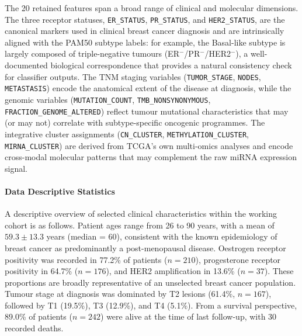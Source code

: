 The 20 retained features span a broad range of clinical and molecular
dimensions. The three receptor statuses, \texttt{ER\_STATUS},
\texttt{PR\_STATUS}, and \texttt{HER2\_STATUS}, are the canonical markers
used in clinical breast cancer diagnosis and are intrinsically aligned with the
PAM50 subtype labels: for example, the Basal-like subtype is largely composed
of triple-negative tumours (ER$^-$/PR$^-$/HER2$^-$), a well-documented
biological correspondence that provides a natural consistency check for
classifier outputs. The TNM staging variables (\texttt{TUMOR\_STAGE},
\texttt{NODES}, \texttt{METASTASIS}) encode the anatomical extent of the
disease at diagnosis, while the genomic variables (\texttt{MUTATION\_COUNT},
\texttt{TMB\_NONSYNONYMOUS}, \texttt{FRACTION\_GENOME\_ALTERED}) reflect
tumour mutational characteristics that may (or may not) correlate with subtype-specific
oncogenic programmes. The integrative cluster assignments
(\texttt{CN\_CLUSTER}, \texttt{METHYLATION\_CLUSTER}, \texttt{MIRNA\_CLUSTER})
are derived from TCGA's own multi-omics analyses and encode cross-modal
molecular patterns that may complement the raw miRNA expression signal.

\paragraph{Data Descriptive Statistics} A descriptive overview of selected clinical characteristics within the working
cohort is as follows. Patient ages range from 26 to 90 years, with a mean of
$59.3 \pm 13.3$ years (median = 60), consistent with the known epidemiology of
breast cancer as predominantly a post-menopausal disease. Oestrogen receptor
positivity was recorded in 77.2\% of patients ($n = 210$), progesterone receptor
positivity in 64.7\% ($n = 176$), and HER2 amplification in 13.6\% ($n = 37$).
These proportions are broadly representative of an unselected breast cancer
population. Tumour stage at diagnosis was dominated by T2 lesions (61.4\%,
$n = 167$), followed by T1 (19.5\%), T3 (12.9\%), and T4 (5.1\%). From a
survival perspective, 89.0\% of patients ($n = 242$) were alive at the time of
last follow-up, with 30 recorded deaths.



